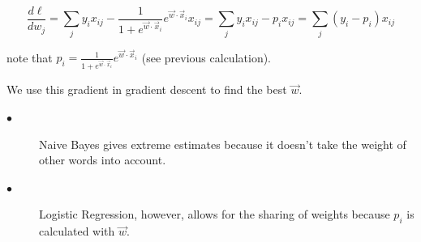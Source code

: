 $$\frac{d\ell}{dw_j} =  \sum_j{y_ix_{ij} - \frac{1}{1+e^{\vec{w}\cdot\vec{x}_i}}e^{\vec{w}\cdot\vec{x}_i}x_{ij}} = \sum_j{y_ix_{ij} - p_ix_{ij}} = 
\sum_j (y_i-p_i)x_{ij}$$

note that $p_i = \frac{1}{1+e^{\vec{w}\cdot\vec{x}_i}}e^{\vec{w}\cdot\vec{x}_i}$ (see previous calculation).

We use this gradient in gradient descent to find the best $\vec{w}$. 

\begin{description}
\item[$\bullet$] Naive Bayes gives extreme estimates because it doesn't take the weight of other words into account. 
\item[$\bullet$] Logistic Regression, however, allows for the sharing of weights because $p_i$ is calculated with $\vec{w}$.
\end{description}



